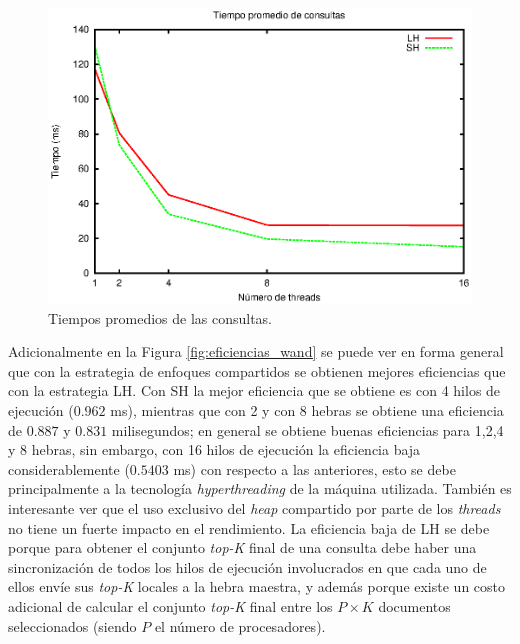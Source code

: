 \begin{figure}[tp]
\centering
\includegraphics[scale=.75]{images/tiempos_wand.eps}
\caption{Tiempos promedios de las consultas.}
\label{fig:tiempos_wand}
\end{figure}

Adicionalmente en la Figura \ref{fig:eficiencias_wand} se puede ver en forma general que con la estrategia de enfoques compartidos se obtienen mejores eficiencias que con la estrategia LH. Con SH la mejor eficiencia que se obtiene es con 4 hilos de ejecución ($0.962$ ms), mientras que con 2 y con 8 hebras se obtiene una eficiencia de $0.887$ y $0.831$ milisegundos; en general se obtiene buenas eficiencias para 1,2,4 y 8 hebras, sin embargo, con 16 hilos de ejecución la eficiencia baja considerablemente ($0.5403$ ms) con respecto a las anteriores, esto se debe principalmente a la tecnología \textit{hyperthreading} de la máquina utilizada. También es interesante ver que el uso exclusivo del \textit{heap} compartido por parte de los \textit{threads} no tiene un fuerte impacto en el rendimiento. La eficiencia baja de LH se debe porque para obtener el conjunto \textit{top-K} final de una consulta debe haber una sincronización de todos los hilos de ejecución involucrados en que cada uno de ellos envíe sus \textit{top-K} locales a la hebra maestra, y además porque existe un costo adicional de calcular el conjunto \textit{top-K} final entre los $P \times K$ documentos seleccionados (siendo $P$ el número de procesadores). 
                     

